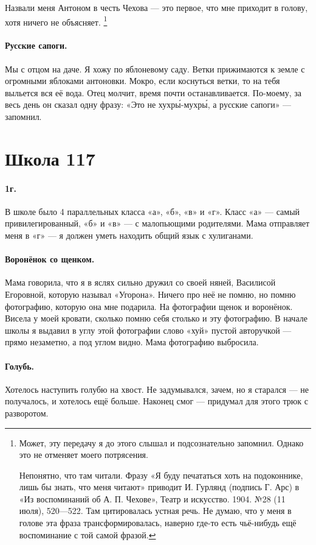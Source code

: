 \documentclass{book}
\begin{document}
Назвали меня Антоном в честь Чехова --- это первое, что мне приходит в голову,
хотя ничего не объясняет.%
\footnote{Может, эту передачу я до этого слышал и подсознательно запомнил.
Однако это не отменяет моего потрясения.

Непонятно, что там читали. 
Фразу «Я буду печататься хоть на подоконнике, лишь бы знать, что меня читают» приводит И. Гурлянд (подпись Г. Арс) в  «Из воспоминаний об А. П. Чехове», Театр и искусство. 1904. №28 (11 июля), 520---522.
Там цитировалась устная речь.
Не думаю, что у меня в голове эта фраза трансформировалась, наверно где-то есть чьё-нибудь ещё воспоминание с той самой фразой.}

\paragraph{Русские сапоги.}
Мы с отцом на даче.
Я хожу по яблоневому саду.
Ветки прижимаются к земле с огромными яблоками антоновки.
Мокро, если коснуться ветки, то на тебя выльется вся её вода.
Отец молчит,
время почти останавливается.
По-моему, за весь день он сказал одну фразу: 
«Это не хухр\'{ы}-мухр\'{ы}, а русские сапоги» --- запомнил.

\section*{Школа 117}

\paragraph{1г.}В школе было 4 параллельных класса «а», «б», «в» и «г».
Класс «а» --- самый привилегированный, «б» и «в» --- с малопьющими родителями.
Мама отправляет меня в «г» --- я должен уметь находить общий язык с хулиганами.

\paragraph{Воронёнок со щенком.}
Мама говорила, что я в яслях сильно дружил со своей няней, Василисой Егоровной,
которую называл «Угорона».
Ничего про неё не помню, но помню фотографию, которую она мне подарила.
На фотографии щенок и воронёнок.
Висела у моей кровати, сколько помню себя столько и эту фотографию.
В начале школы я выдавил в углу этой фотографии слово «хуй» пустой авторучкой --- прямо незаметно, а под углом видно.
Мама фотографию выбросила.

\paragraph{Голубь.}
Хотелось наступить голубю на хвост.
Не задумывался, зачем, но я старался — не получалось, и хотелось ещё больше.
Наконец смог — придумал для этого трюк с разворотом.
\end{document}
